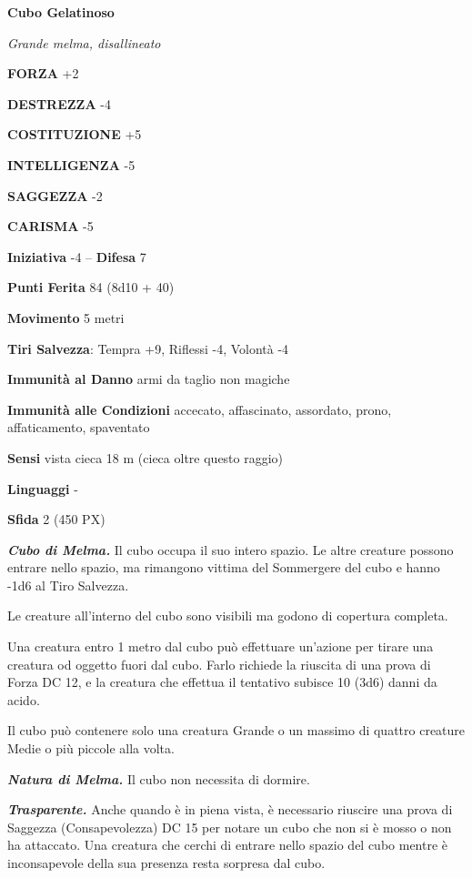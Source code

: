 \begin{multicols}{2}
\medskip{}\textbf{Cubo Gelatinoso}

\textit{Grande melma, disallineato}

\textbf{FORZA} +2

\textbf{DESTREZZA} -4

\textbf{COSTITUZIONE} +5

\textbf{INTELLIGENZA} -5

\textbf{SAGGEZZA} -2

\textbf{CARISMA} -5

\textbf{Iniziativa} -4 -- \textbf{Difesa} 7

\textbf{Punti Ferita} 84 (8d10 + 40)

\textbf{Movimento} 5 metri

\textbf{Tiri Salvezza}: Tempra +9, Riflessi -4, Volontà -4

\textbf{Immunità al Danno} armi da taglio non magiche

\textbf{Immunità alle Condizioni} accecato, affascinato, assordato, prono, affaticamento, spaventato

\textbf{Sensi} vista cieca 18 m (cieca oltre questo raggio)

\textbf{Linguaggi} -

\textbf{Sfida} 2 (450 PX)

\textit{\textbf{Cubo di Melma.}} Il cubo occupa il suo intero spazio. Le altre creature possono entrare nello spazio, ma rimangono vittima del Sommergere del cubo e hanno -1d6 al Tiro Salvezza.

Le creature all'interno del cubo sono visibili ma godono di copertura completa.

Una creatura entro 1 metro dal cubo può effettuare un'azione per tirare una creatura od oggetto fuori dal cubo. Farlo richiede la riuscita di una prova di Forza DC 12, e la creatura che effettua il tentativo subisce 10 (3d6) danni da acido.

Il cubo può contenere solo una creatura Grande o un massimo di quattro creature Medie o più piccole alla volta.

\textit{\textbf{Natura di Melma.}} Il cubo non necessita di dormire.

\textit{\textbf{Trasparente.}} Anche quando è in piena vista, è necessario riuscire una prova di Saggezza (Consapevolezza) DC 15 per notare un cubo che non si è mosso o non ha attaccato. Una creatura che cerchi di entrare nello spazio del cubo mentre è inconsapevole della sua presenza resta sorpresa dal cubo.


\end{multicols}
